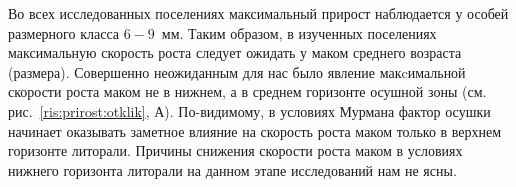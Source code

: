 Во всех исследованных поселениях максимальный прирост наблюдается у особей размерного класса $6 - 9$~мм. 
Таким образом, в изученных поселениях максимальную скорость роста следует ожидать у маком среднего возраста (размера). 
Совершенно неожиданным для нас было явление макcимальной скорости роста маком не в нижнем, а в среднем горизонте осушной зоны (см. рис.~\ref{ris:prirost:otklik}, А). 
По-видимому, в условиях Мурмана фактор осушки начинает оказывать заметное влияние на скорость роста маком только в верхнем горизонте литорали. 
Причины снижения скорости роста маком в условиях нижнего горизонта литорали на данном этапе исследований нам не ясны.
